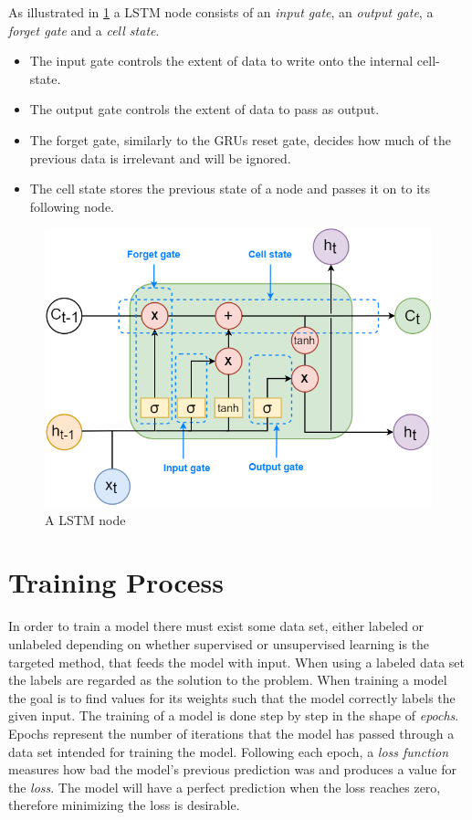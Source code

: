 \documentclass[nofilelist]{cslthse-msc}
\begin{document}
As illustrated in \ref{fig:lstm_node} a LSTM node consists of an \textit{input gate}, an \textit{output gate}, a \textit{forget gate} and a \textit{cell state}. 
\begin{itemize}
    \item The input gate controls the extent of data to write onto the internal cell-state.
    \item The output gate controls the extent of data to pass as output. 
    \item The forget gate, similarly to the GRUs reset gate, decides how much of the previous data is irrelevant and will be ignored. 
    \item The cell state stores the previous state of a node and passes it on to its following node. 
\end{itemize}

\begin{figure}[!ht]
    \centering
    \includegraphics[scale=0.45]{msccls/explanatory_images/lstm.png}
    \caption{A LSTM node}
    \label{fig:lstm_node}
\end{figure}

\section{Training Process}
In order to train a model there must exist some data set, either labeled or unlabeled depending on whether supervised or unsupervised learning is the targeted method, that feeds the model with input. When using a labeled data set the labels are regarded as the solution to the problem. When training a model the goal is to find values for its weights such that the model correctly labels the given input. The training of a model is done step by step in the shape of \textit{epochs}. Epochs represent the number of iterations that the model has passed through a data set intended for training the model. Following each epoch, a \textit{loss function} measures how bad the model's previous prediction was and produces a value for the \textit{loss}. The model will have a perfect prediction when the loss reaches zero, therefore minimizing the loss is desirable. 
\end{document}
